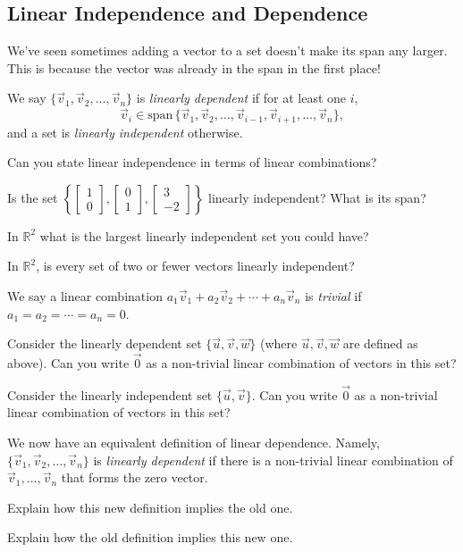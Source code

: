 \documentclass[letter]{article}
\newcommand{\R}{\mathbb{R}}
\renewcommand{\span}{\mathrm{span}\,}
\newcommand{\mat}[1]{\begin{bmatrix}#1\end{bmatrix}}
\begin{document}
\subsection*{Linear Independence and Dependence}
	We've seen sometimes adding a vector to a set doesn't
	make its span any larger.  This is because the vector was already
	in the span in the first place!

	We say $\{\vec v_1,\vec v_2,\ldots,\vec v_n\}$ is
	\emph{linearly dependent} if for at least one $i$,
	\[
		\vec v_i\in\span\{\vec v_1,\vec v_2,\ldots,\vec v_{i-1},
		\vec v_{i+1},\ldots,\vec v_n\},
	\]
	and a set is \emph{linearly independent} otherwise.

	\begin{Enum}
		\item Can you state linear independence in terms
		of linear combinations?
		\item Is the set $\left\{\mat{1\\0},\mat{0\\1},
		\mat{3\\-2}\right\}$ linearly independent?
		What is its span?
		\item In $\R^2$ what is the largest linearly
		independent set you could have?
		\item In $\R^2$, is every set of two or fewer
		vectors linearly independent?
	\end{Enum}

	We say a linear combination 
	$a_1\vec v_1+a_2\vec v_2+\cdots +a_n\vec v_n$
	is \emph{trivial} if $a_1=a_2=\cdots=a_n=0$.
	\begin{Enum}
		\item Consider the linearly dependent 
		set $\{\vec u,\vec v,\vec w\}$ (where $\vec u,\vec v,\vec w$
		are defined as above).  Can you write $\vec 0$
		as a non-trivial linear combination of vectors in this set?
		\item Consider the linearly independent 
		set $\{\vec u,\vec v\}$.  Can you write $\vec 0$
		as a non-trivial linear combination of vectors in this set?
	\end{Enum}

	We now have an equivalent definition of linear dependence.
	Namely, $\{\vec v_1,\vec v_2,\ldots,\vec v_n\}$ is
	\emph{linearly dependent} if there is a non-trivial
	linear combination of $\vec v_1,\ldots,\vec v_n$ that
	forms the zero vector.

	\begin{Enum}
		\item Explain how this new definition implies the old one.
		\item Explain how the old definition implies this new one.
	\end{Enum}
\end{document}

